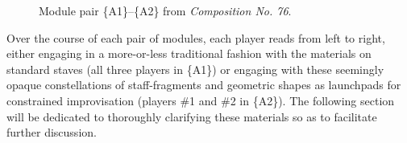                 \begin{figure} 
                    \centering
                    \captionsetup{width=.5\textwidth}
                    \caption[Module pair \{A1\}--\{A2\} from \textit{Composition No. 76}.]{Module pair \{A1\}--\{A2\} from \textit{Composition No. 76}.\footnotemark}
                    \label{fig:a1a2}
                \end{figure}
    
        Over the course of each pair of modules, each player reads from left to right, either engaging in a more-or-less traditional fashion with the materials on standard staves (all three players in \{A1\}) or engaging with these seemingly opaque constellations of staff-fragments and geometric shapes as launchpads for constrained improvisation (players \#1 and \#2 in \{A2\}). The following section will be dedicated to thoroughly clarifying these materials so as to facilitate further discussion.
    
